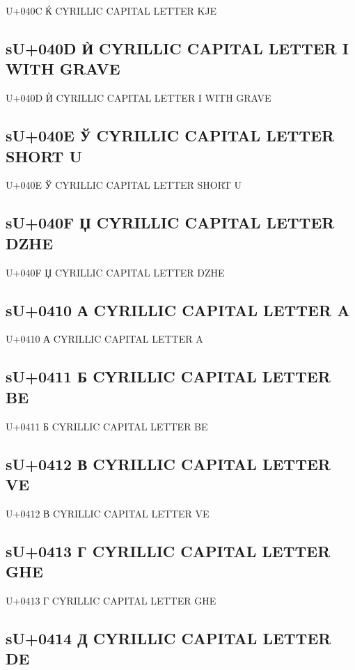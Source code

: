 U+040C Ќ  CYRILLIC CAPITAL LETTER KJE

\subsection{sU+040D Ѝ  CYRILLIC CAPITAL LETTER I WITH GRAVE}

U+040D Ѝ  CYRILLIC CAPITAL LETTER I WITH GRAVE

\subsection{sU+040E Ў  CYRILLIC CAPITAL LETTER SHORT U}

U+040E Ў  CYRILLIC CAPITAL LETTER SHORT U

\subsection{sU+040F Џ  CYRILLIC CAPITAL LETTER DZHE}

U+040F Џ  CYRILLIC CAPITAL LETTER DZHE

\subsection{sU+0410 А  CYRILLIC CAPITAL LETTER A}

U+0410 А  CYRILLIC CAPITAL LETTER A

\subsection{sU+0411 Б  CYRILLIC CAPITAL LETTER BE}

U+0411 Б  CYRILLIC CAPITAL LETTER BE

\subsection{sU+0412 В  CYRILLIC CAPITAL LETTER VE}

U+0412 В  CYRILLIC CAPITAL LETTER VE

\subsection{sU+0413 Г  CYRILLIC CAPITAL LETTER GHE}

U+0413 Г  CYRILLIC CAPITAL LETTER GHE

\subsection{sU+0414 Д  CYRILLIC CAPITAL LETTER DE}

